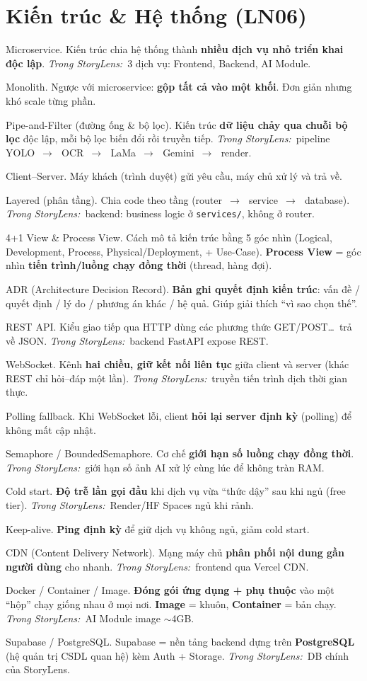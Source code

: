 \documentclass[11pt]{article}
\newcommand{\arr}{\,\ensuremath{\rightarrow}\,}
\newcommand{\code}[1]{\texttt{\small #1}}
\newcommand{\insl}{\textit{\textcolor{steel}{Trong StoryLens:}}\ }
\begin{document}
\section{Kiến trúc \& Hệ thống (LN06)}
\begin{terms}
\item[Microservice.] Kiến trúc chia hệ thống thành \textbf{nhiều dịch vụ nhỏ triển khai độc lập}. \insl 3 dịch vụ: Frontend, Backend, AI Module.
\item[Monolith.] Ngược với microservice: \textbf{gộp tất cả vào một khối}. Đơn giản nhưng khó scale từng phần.
\item[Pipe-and-Filter (đường ống \& bộ lọc).] Kiến trúc \textbf{dữ liệu chảy qua chuỗi bộ lọc} độc lập, mỗi bộ lọc biến đổi rồi truyền tiếp. \insl pipeline YOLO \arr\ OCR \arr\ LaMa \arr\ Gemini \arr\ render.
\item[Client--Server.] Máy khách (trình duyệt) gửi yêu cầu, máy chủ xử lý và trả về.
\item[Layered (phân tầng).] Chia code theo tầng (router \arr\ service \arr\ database). \insl backend: business logic ở \code{services/}, không ở router.
\item[4+1 View \& Process View.] Cách mô tả kiến trúc bằng 5 góc nhìn (Logical, Development, Process, Physical/Deployment, + Use-Case). \textbf{Process View} = góc nhìn \textbf{tiến trình/luồng chạy đồng thời} (thread, hàng đợi).
\item[ADR (Architecture Decision Record).] \textbf{Bản ghi quyết định kiến trúc}: vấn đề / quyết định / lý do / phương án khác / hệ quả. Giúp giải thích ``vì sao chọn thế''.
\item[REST API.] Kiểu giao tiếp qua HTTP dùng các phương thức GET/POST\ldots\ trả về JSON. \insl backend FastAPI expose REST.
\item[WebSocket.] Kênh \textbf{hai chiều, giữ kết nối liên tục} giữa client và server (khác REST chỉ hỏi--đáp một lần). \insl truyền tiến trình dịch thời gian thực.
\item[Polling fallback.] Khi WebSocket lỗi, client \textbf{hỏi lại server định kỳ} (polling) để không mất cập nhật.
\item[Semaphore / BoundedSemaphore.] Cơ chế \textbf{giới hạn số luồng chạy đồng thời}. \insl giới hạn số ảnh AI xử lý cùng lúc để không tràn RAM.
\item[Cold start.] \textbf{Độ trễ lần gọi đầu} khi dịch vụ vừa ``thức dậy'' sau khi ngủ (free tier). \insl Render/HF Spaces ngủ khi rảnh.
\item[Keep-alive.] \textbf{Ping định kỳ} để giữ dịch vụ không ngủ, giảm cold start.
\item[CDN (Content Delivery Network).] Mạng máy chủ \textbf{phân phối nội dung gần người dùng} cho nhanh. \insl frontend qua Vercel CDN.
\item[Docker / Container / Image.] \textbf{Đóng gói ứng dụng + phụ thuộc} vào một ``hộp'' chạy giống nhau ở mọi nơi. \textbf{Image} = khuôn, \textbf{Container} = bản chạy. \insl AI Module image $\sim$4GB.
\item[Supabase / PostgreSQL.] Supabase = nền tảng backend dựng trên \textbf{PostgreSQL} (hệ quản trị CSDL quan hệ) kèm Auth + Storage. \insl DB chính của StoryLens.
\end{terms}
\end{document}
